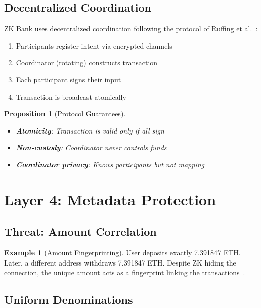 \documentclass[11pt]{article}
\theoremstyle{definition}
\newtheorem{example}{Example}[section]
\theoremstyle{plain}
\newtheorem{proposition}{Proposition}[section]
\theoremstyle{remark}
\begin{document}
\subsection{Decentralized Coordination}

ZK Bank uses decentralized coordination following the protocol of Ruffing et al.~\cite{ruffing2014coinshuffle}:

\begin{enumerate}
    \item Participants register intent via encrypted channels
    \item Coordinator (rotating) constructs transaction
    \item Each participant signs their input
    \item Transaction is broadcast atomically
\end{enumerate}

\begin{proposition}[Protocol Guarantees]
\begin{itemize}
    \item \textbf{Atomicity}: Transaction is valid only if all sign
    \item \textbf{Non-custody}: Coordinator never controls funds
    \item \textbf{Coordinator privacy}: Knows participants but not mapping
\end{itemize}
\end{proposition}

\section{Layer 4: Metadata Protection}
\label{sec:layer4}

\subsection{Threat: Amount Correlation}

\begin{example}[Amount Fingerprinting]
User deposits exactly 7.391847 ETH. Later, a different address withdraws 7.391847 ETH. Despite ZK hiding the connection, the unique amount acts as a fingerprint linking the transactions~\cite{moser2013anonymity}.
\end{example}

\subsection{Uniform Denominations}
\end{document}
